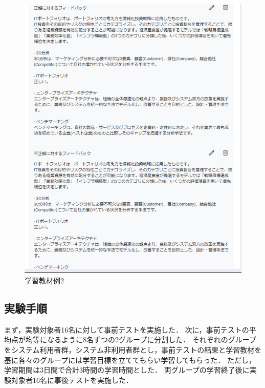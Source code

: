 \begin{figure}[htbp]
\begin{center}
\includegraphics[width=16cm]{img/kyozai2.eps}
\end{center}
\caption{学習教材例2}
\label{fig:kyozai2}
\end{figure}

\subsection{実験手順}
まず，実験対象者16名に対して事前テストを実施した．
次に，事前テストの平均点が均等になるように8名ずつの2グループに分割した．
それぞれのグループをシステム利用者群，システム非利用者群とし，事前テストの結果と学習教材を基に各々のグループには学習目標を立ててもらい学習してもらった．
ただし，学習期間は3日間で合計3時間の学習時間とした．
両グループの学習終了後に実験対象者16名に事後テストを実施した．

